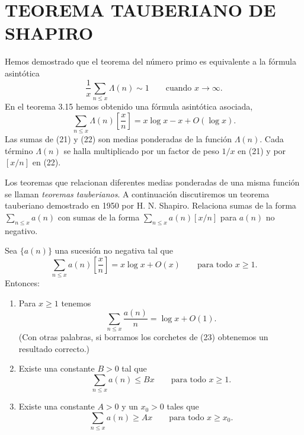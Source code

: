 \documentclass[12pt,a4paper]{book}
\begin{document}
    \section{TEOREMA TAUBERIANO DE SHAPIRO}

    Hemos demostrado que el teorema del número primo es equivalente a la fórmula
    asintótica
    \begin{equation}
        \frac{1}{x}\sum_{n\leq x}\Lambda(n)\sim1\qquad\text{cuando } x\to\infty.
    \end{equation}
    En el teorema 3.15 hemos obtenido una fórmula asintótica asociada,
    \begin{equation}
        \sum_{n\leq x}\Lambda(n)\left[\frac{x}{n}\right]=x\log x-x+O(\log x).
    \end{equation}
    Las sumas de (21) y (22) son medias ponderadas de la función $\Lambda(n)$. Cada
    término $\Lambda(n)$ se halla multiplicado por un factor de peso $1/x$ en (21) y
    por $[x/n]$ en (22).

    Los teoremas que relacionan diferentes medias ponderadas de una misma función se
    llaman \textit{teoremas tauberianos}. A continuación discutiremos un teorema
    tauberiano demostrado en 1950 por H. N. Shapiro. Relaciona sumas de la forma
    $\sum_{n\leq x}a(n)$ con sumas de la forma $\sum_{n\leq x}a(n)[x/n]$ para $a(n)$ no
    negativo.

    \begin{teorema}
        Sea $\{a(n)\}$ una sucesión no negativa tal que
        \begin{equation}
            \sum_{n\leq x}a(n)\left[\frac{x}{n}\right]=x\log x+O(x)\qquad\text{para todo } x\geq1.
        \end{equation}
        Entonces:
        \begin{enumerate}
            \item[(a)] Para $x\geq1$ tenemos
            \begin{equation*}
                \sum_{n\leq x}\frac{a(n)}{n}=\log x+O(1).
            \end{equation*}
            (Con otras palabras, si borramos los corchetes de (23) obtenemos un
            resultado correcto.)
            \item[(b)] Existe una constante $B>0$ tal que
            \begin{equation*}
                \sum_{n\leq x}a(n)\leq Bx\qquad\text{para todo } x\geq1.
            \end{equation*}
            \item[(c)] Existe una constante $A>0$ y un $x_0>0$ tales que
            \begin{equation*}
                \sum_{n\leq x}a(n)\geq Ax\qquad\text{para todo } x\geq x_0.
            \end{equation*}
        \end{enumerate}
    \end{teorema}
\end{document}
